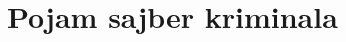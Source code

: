 \documentclass[a4paper]{article}
\theoremstyle{break}
\newtheorem{primer}{Primer}[section]
\begin{document}
{%








\section{Pojam sajber kriminala}
\label{pojam}

}
\end{document}
